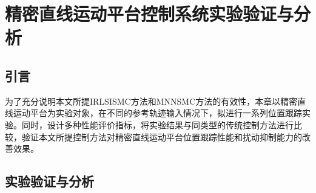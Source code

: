 \chapter{精密直线运动平台控制系统实验验证与分析}
\section{引言}
为了充分说明本文所提IRLSISMC方法和MNNSMC方法的有效性，本章以精密直线运动平台为实验对象，在不同的参考轨迹输入情况下，拟进行一系列位置跟踪实验。同时，设计多种性能评价指标，将实验结果与同类型的传统控制方法进行比较，验证本文所提控制方法对精密直线运动平台位置跟踪性能和扰动抑制能力的改善效果。

\section{实验验证与分析}
